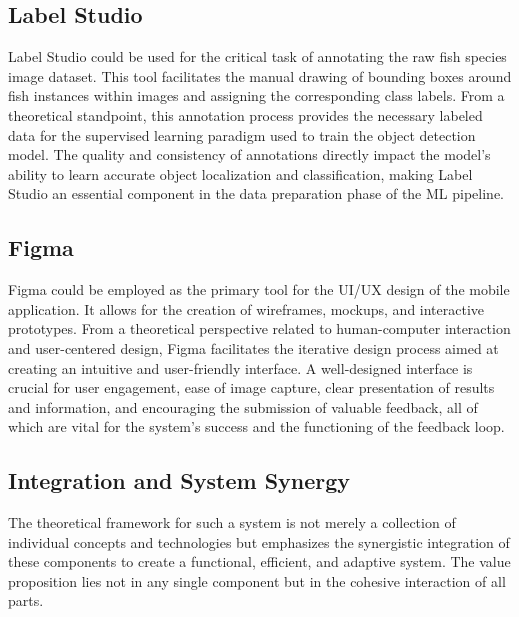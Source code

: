 \subsection{Label Studio}
Label Studio could be used for the critical task of annotating the raw fish species image dataset. This
tool facilitates the manual drawing of bounding boxes around fish instances within images and assigning the
corresponding class labels. From a theoretical standpoint, this annotation process provides the necessary
labeled data for the supervised learning paradigm used to train the object detection model. The quality
and consistency of annotations directly impact the model’s ability to learn accurate object localization and
classification, making Label Studio an essential component in the data preparation phase of the ML pipeline.


\subsection{Figma}
Figma could be employed as the primary tool for the UI/UX design of the mobile application. It allows for
the creation of wireframes, mockups, and interactive prototypes. From a theoretical perspective related to
human-computer interaction and user-centered design, Figma facilitates the iterative design process aimed
at creating an intuitive and user-friendly interface. A well-designed interface is crucial for user engagement,
ease of image capture, clear presentation of results and information, and encouraging the submission of
valuable feedback, all of which are vital for the system’s success and the functioning of the feedback loop.


\subsection{Integration and System Synergy}
The theoretical framework for such a system is not merely a collection of individual concepts and technologies
but emphasizes the synergistic integration of these components to create a functional, efficient, and adaptive
system. The value proposition lies not in any single component but in the cohesive interaction of all parts.

